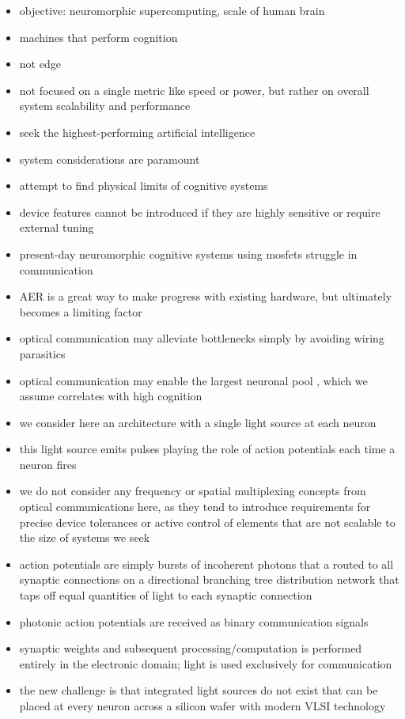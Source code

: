\documentclass[twocolumn]{article}
\begin{document}
\begin{itemize}
\item objective: neuromorphic supercomputing, scale of human brain
\item machines that perform cognition
\item not edge
\item not focused on a single metric like speed or power, but rather on overall system scalability and performance
\item seek the highest-performing artificial intelligence
\item system considerations are paramount
\item attempt to find physical limits of cognitive systems
\item device features cannot be introduced if they are highly sensitive or require external tuning
\item present-day neuromorphic cognitive systems using mosfets struggle in communication
\item AER is a great way to make progress with existing hardware, but ultimately becomes a limiting factor
\item optical communication may alleviate bottlenecks simply by avoiding wiring parasitics
\item optical communication may enable the largest neuronal pool \cite{sh2018_ICRC}, which we assume correlates with high cognition
\item we consider here an architecture with a single light source at each neuron
\item this light source emits pulses playing the role of action potentials each time a neuron fires
\item we do not consider any frequency or spatial multiplexing concepts from optical communications here, as they tend to introduce requirements for precise device tolerances or active control of elements that are not scalable to the size of systems we seek
\item action potentials are simply bursts of incoherent photons that a routed to all synaptic connections on a directional branching tree distribution network that taps off equal quantities of light to each synaptic connection
\item photonic action potentials are received as binary communication signals
\item synaptic weights and subsequent processing/computation is performed entirely in the electronic domain; light is used exclusively for communication
\item the new challenge is that integrated light sources do not exist that can be placed at every neuron across a silicon wafer with modern VLSI technology

\end{itemize}
\end{document}
